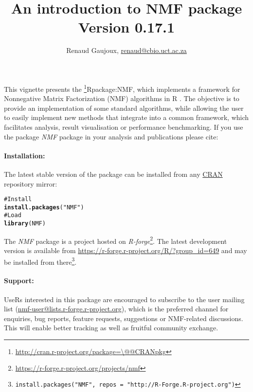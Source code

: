 \documentclass[a4paper]{article}\usepackage{graphicx, color}
\makeatletter
\newcommand{\hlfunctioncall}[1]{\textcolor[rgb]{0.501960784313725,0,0.329411764705882}{\textbf{#1}}}%
\newcommand{\hlstring}[1]{\textcolor[rgb]{0.6,0.6,1}{#1}}%
\newcommand{\hlcomment}[1]{\textcolor[rgb]{0.180392156862745,0.6,0.341176470588235}{#1}}%
\newenvironment{kframe}{%
 \def\at@end@of@kframe{}%
 \ifinner\ifhmode%
  \def\at@end@of@kframe{\end{minipage}}%
  \begin{minipage}{\columnwidth}%
 \fi\fi%
 \def\FrameCommand##1{\hskip\@totalleftmargin \hskip-\fboxsep
 \colorbox{shadecolor}{##1}\hskip-\fboxsep
     \hskip-\linewidth \hskip-\@totalleftmargin \hskip\columnwidth}%
 \MakeFramed {\advance\hsize-\width
   \@totalleftmargin\z@ \linewidth\hsize
   \@setminipage}}%
 {\par\unskip\endMakeFramed%
 \at@end@of@kframe}
\newenvironment{knitrout}{}{} %
\let\code=\texttt
\newcommand{\pkgname}[1]{\textit{#1}\xspace}
\newcommand{\Rpkg}[1]{\pkgname{#1} package\xspace}
\newcommand{\CRANurl}[1]{\url{http://cran.r-project.org/package=#1}}
\def\CRANpkg{\@ifstar\@CRANpkg\@@CRANpkg}
\def\@CRANpkg#1{\href{http://cran.r-project.org/package=#1}{\pkgname{#1}}\footnote{\CRANurl{#1}}}
\def\@@CRANpkg#1{\href{http://cran.r-project.org/package=#1}{\pkgname{#1}} package\footnote{\CRANurl{#1}}}
\def\citeCRANpkg{\@ifstar\@citeCRANpkg\@@citeCRANpkg}
\def\@citeCRANpkg#1{\CRANpkg{#1}\cite*{Rpackage:#1}}
\def\@@citeCRANpkg#1{\CRANpkg{#1}~\cite{Rpackage:#1}}
\newcommand{\nmfpack}{\Rpkg{NMF}}
\renewcommand{\cite}[1]{\parencite{#1}}
\makeatother
\begin{document}
\title{An introduction to NMF package\\
\small Version 0.17.1}
\author{Renaud Gaujoux, \url{renaud@cbio.uct.ac.za}}

\maketitle

This vignette presents the \citeCRANpkg{NMF}, which implements a framework
for Nonnegative Matrix Factorization (NMF) algorithms in R \cite{R}.
The objective is to provide an implementation of some standard algorithms, while
allowing the user to easily implement new methods that integrate into a
common framework, which facilitates analysis, result visualisation or
performance benchmarking.
If you use the package \nmfpack in your analysis and publications please cite:

\bigskip
{}

\bigskip
\paragraph{Installation:} The latest stable version of the package can be installed from any
\href{http://cran.r-project.org}{CRAN} repository mirror:
\begin{knitrout}
\color{fgcolor}\begin{kframe}
\begin{alltt}
\hlcomment{# Install}
\hlfunctioncall{install.packages}(\hlstring{"NMF"})
\hlcomment{# Load}
\hlfunctioncall{library}(NMF)
\end{alltt}
\end{kframe}
\end{knitrout}

The \nmfpack is a project hosted on \emph{R-forge}\footnote{\url{https://r-forge.r-project.org/projects/nmf}}.
The latest development version is available from \url{https://r-forge.r-project.org/R/?group_id=649} and may be installed from there\footnote{\code{install.packages("NMF", repos = "http://R-Forge.R-project.org")}}.

\paragraph{Support:} UseRs interested in this package are encouraged to subscribe to the user mailing list (\href{https://lists.r-forge.r-project.org/mailman/listinfo/nmf-user}{nmf-user@lists.r-forge.r-project.org}), which is the preferred channel for enquiries, bug reports, feature requests, suggestions or NMF-related discussions.
This will enable better tracking as well as fruitful community exchange.
\end{document}
